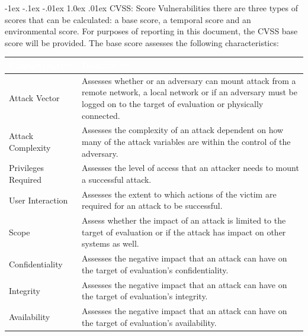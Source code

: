 \documentclass{article}
\makeatletter
\renewcommand{\section}{\@startsection{section}{1}{\z@}%
            {-1ex \@plus -.1ex \@minus -.01ex}%
            {1.0ex \@plus  .01ex}%
            {\normalfont\large\bfseries\color{sectioncolor}}}
\makeatother
\begin{document}
            \section{\large CVSS: Score Vulnerabilities}
            \large there are three types of scores that can be calculated: a base score, a temporal score and an environmental score. For purposes of reporting in this document, the CVSS base score will be provided. The base score assesses the following characteristics:
            \begin{center}
                \begin{longtable} {|p{9em}|p{31em}|}
                \hline 
                \large \cellcolor{tablecol} \textcolor{white}{\textbf{Characteristics}} & \large \cellcolor{tablecol} \textcolor{white}{\textbf{Description}}   \\    
                \hline
                \normalsize Attack Vector & \normalsize Assesses whether or an adversary can mount attack from a remote network, a local
                network or if an adversary must be logged on to the target of evaluation or physically
                connected.  \\
                \hline
                \normalsize Attack Complexity  & \normalsize Assesses the complexity of an attack dependent on how many of the attack variables are
                within the control of the adversary.  \\
                \hline
                \normalsize Privileges Required  & \normalsize Assesses the level of access that an attacker needs to mount a successful attack. \\
                \hline
                \normalsize User Interaction & \normalsize Assesses the extent to which actions of the victim are required for an attack to be
                successful. \\
                \hline
                \normalsize Scope & \normalsize Assess whether the impact of an attack is limited to the target of evaluation or if the attack
                has impact on other systems as well. \\
                \hline
                \normalsize Confidentiality & \normalsize Assesses the negative impact that an attack can have on the target of evaluation's
                confidentiality. \\
                \hline
                \normalsize Integrity & \normalsize Assesses the negative impact that an attack can have on the target of evaluation's
                integrity. \\
                \hline
                \normalsize Availability & \normalsize Assesses the negative impact that an attack can have on the target of evaluation's
                availability. \\
                \hline
                \end{longtable}   
            \end{center} 
\end{document}

